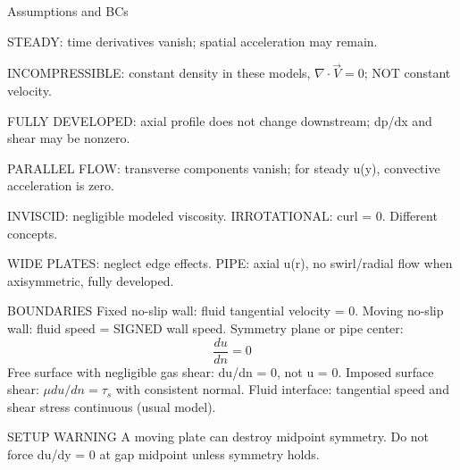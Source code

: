 Assumptions and BCs

STEADY: time derivatives vanish; spatial acceleration may remain.

INCOMPRESSIBLE: constant density in these models, $\nabla\cdot\vec V=0$; NOT constant velocity.

FULLY DEVELOPED: axial profile does not change downstream; dp/dx and shear may be nonzero.

PARALLEL FLOW: transverse components vanish; for steady u(y), convective acceleration is zero.

INVISCID: negligible modeled viscosity. IRROTATIONAL: curl = 0. Different concepts.

WIDE PLATES: neglect edge effects.
PIPE: axial u(r), no swirl/radial flow when axisymmetric, fully developed.

BOUNDARIES
Fixed no-slip wall: fluid tangential velocity = 0.
Moving no-slip wall: fluid speed = SIGNED wall speed.
Symmetry plane or pipe center:
$$\frac{du}{dn}=0$$
Free surface with negligible gas shear: du/dn = 0, not u = 0.
Imposed surface shear: $\mu du/dn=\tau_s$ with consistent normal.
Fluid interface: tangential speed and shear stress continuous (usual model).

SETUP WARNING
A moving plate can destroy midpoint symmetry. Do not force du/dy = 0 at gap midpoint unless symmetry holds.
